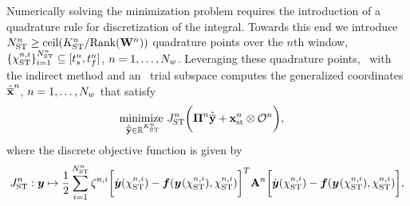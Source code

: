 Numerically solving the minimization problem requires the introduction of a quadrature rule for 
discretization of the integral. Towards this end we introduce $N_{\text{ST}}^{n} \ge \text{ceil}(K_{\text{ST}}^{n}/ \text{Rank}(\mathbf{W}^{n}))$ quadrature points over the $n$th window, $ \{ \chi_{\text{ST}}^{n,i} \}_{i=1}^{N_{\text{ST}}^{n}} \subseteq [t_s^{n},t_f^{n}]$, $n=1,\ldots,N_w$. 
Leveraging these quadrature points, \methodAcronym\ with the indirect method and an \spaceTimeAcronym\ trial subspace computes the generalized coordinates 
$\hat{\mathbf{\overline{x}}}^{n}$, $n=1,\ldots,N_w$ that satisfy
\begin{equation}\label{eq:obj_gen_slab2} 
\begin{split}
&\underset{\stgenstatey \in \RR{\stdimArg{n}}}{\text{minimize }} \objectiveDiscreteSTArg{n} \bigg( \stbasisArgnt{n} \stgenstatey + \stateInterceptSTArg{n} \otimes \onesFunctionArg{n}  \bigg) , %
\end{split} 
\end{equation}
where the discrete objective function is given by
$$J_{\text{ST}}^{n}: \boldsymbol y \mapsto \frac{1}{2}\sum_{i=1}^{N_{\text{ST}}^{n}} \zeta^{n,i} 
\bigg[ \dot{\boldsymbol y}(\chi_{\text{ST}}^{n,i})  - \boldsymbol f (\boldsymbol y^{}(\chi_{\text{ST}}^{n,i}),\chi_{\text{ST}}^{n,i} ) \bigg]^T 
\mathbf{A}^{n} 
\bigg[ \dot{\boldsymbol y}(\chi_{\text{ST}}^{n,i})  - \boldsymbol f (\boldsymbol y^{}(\chi_{\text{ST}}^{n,i}),\chi_{\text{ST}}^{n,i} ) \bigg],
$$
